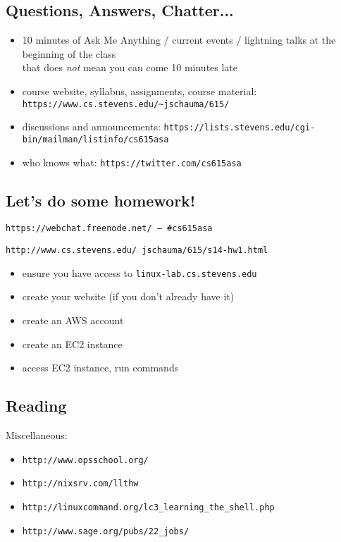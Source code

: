 \documentclass[xga]{xdvislides}
\begin{document}
\subsection{Questions, Answers, Chatter...}
\begin{itemize}
	\item 10 minutes of Ask Me Anything / current events / lightning talks at the beginning of the class \\
		\small that does {\em not} mean you can come 10 minutes late \Normalsize
	\\

	\item course website, syllabus, assignments, course material:\\
		\verb+https://www.cs.stevens.edu/~jschauma/615/+
	\\

	\item discussions and announcements:
		\verb+https://lists.stevens.edu/cgi-bin/mailman/listinfo/cs615asa+
	\\

	\item who knows what: \verb+https://twitter.com/cs615asa+
\end{itemize}

\subsection{Let's do some homework!}

{\tt https://webchat.freenode.net/ -- \#cs615asa} \\
\vspace{.25in}

{\tt http://www.cs.stevens.edu/~jschauma/615/s14-hw1.html} \\
\vspace{.25in}

\begin{itemize}
	\item ensure you have access to {\tt linux-lab.cs.stevens.edu}
	\item create your website (if you don't already have it)
	\item create an AWS account
	\item create an EC2 instance
	\item access EC2 instance, run commands
\end{itemize}

\subsection{Reading}
Miscellaneous:
\begin{itemize}
	\item \verb+http://www.opsschool.org/+
	\item \verb+http://nixsrv.com/llthw+
	\item \verb+http://linuxcommand.org/lc3_learning_the_shell.php+
	\item \verb+http://www.sage.org/pubs/22_jobs/+
\end{itemize}
\end{document}

